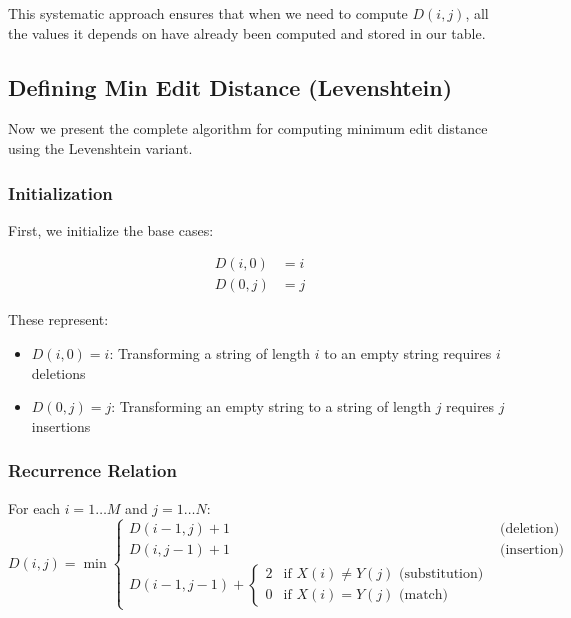 \documentclass[11pt,a4paper]{article}
\theoremstyle{definition}
\theoremstyle{plain}
\theoremstyle{remark}
\begin{document}
This systematic approach ensures that when we need to compute $D(i,j)$, all the values it depends on have already been computed and stored in our table.

\subsection{Defining Min Edit Distance (Levenshtein)}

Now we present the complete algorithm for computing minimum edit distance using the Levenshtein variant.

\subsubsection{Initialization}

First, we initialize the base cases:

\begin{align*}
D(i,0) &= i \\
D(0,j) &= j
\end{align*}

These represent:
\begin{itemize}
    \item $D(i,0) = i$: Transforming a string of length $i$ to an empty string requires $i$ deletions
    \item $D(0,j) = j$: Transforming an empty string to a string of length $j$ requires $j$ insertions
\end{itemize}

\subsubsection{Recurrence Relation}

\begin{tcolorbox}[colback=teal!10!white,colframe=teal!75!black,title=\textbf{Levenshtein Edit Distance Recurrence}]
For each $i = 1 \ldots M$ and $j = 1 \ldots N$:
\[
D(i,j) = \min \begin{cases}
D(i-1,j) + 1 & \text{(deletion)} \\
D(i,j-1) + 1 & \text{(insertion)} \\
D(i-1,j-1) + \begin{cases}
2 & \text{if } X(i) \neq Y(j) \text{ (substitution)} \\
0 & \text{if } X(i) = Y(j) \text{ (match)}
\end{cases}
\end{cases}
\]
\end{tcolorbox}
\end{document}
